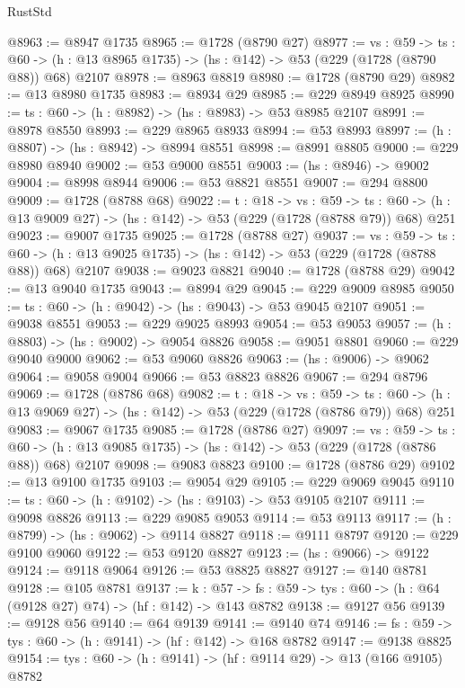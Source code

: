 \begin{lexlean}{RustStd}
\begin{coremodule}
@8963 := @8947 @1735
@8965 := @1728 (@8790 @27)
@8977 := {vs : @59} ->
  {ts : @60} -> (h : @13 @8965 @1735) -> (hs : @142) -> @53 (@229 (@1728 (@8790 @88)) @68) @2107
@8978 := @8963 @8819
@8980 := @1728 (@8790 @29)
@8982 := @13 @8980 @1735
@8983 := @8934 @29
@8985 := @229 @8949 @8925
@8990 := {ts : @60} -> (h : @8982) -> (hs : @8983) -> @53 @8985 @2107
@8991 := @8978 @8550
@8993 := @229 @8965 @8933
@8994 := @53 @8993
@8997 := (h : @8807) -> (hs : @8942) -> @8994 @8551
@8998 := @8991 @8805
@9000 := @229 @8980 @8940
@9002 := @53 @9000 @8551
@9003 := (hs : @8946) -> @9002
@9004 := @8998 @8944
@9006 := @53 @8821 @8551
@9007 := @294 @8800
@9009 := @1728 (@8788 @68)
@9022 := {t : @18} ->
  {vs : @59} ->
  {ts : @60} -> (h : @13 @9009 @27) -> (hs : @142) -> @53 (@229 (@1728 (@8788 @79)) @68) @251
@9023 := @9007 @1735
@9025 := @1728 (@8788 @27)
@9037 := {vs : @59} ->
  {ts : @60} -> (h : @13 @9025 @1735) -> (hs : @142) -> @53 (@229 (@1728 (@8788 @88)) @68) @2107
@9038 := @9023 @8821
@9040 := @1728 (@8788 @29)
@9042 := @13 @9040 @1735
@9043 := @8994 @29
@9045 := @229 @9009 @8985
@9050 := {ts : @60} -> (h : @9042) -> (hs : @9043) -> @53 @9045 @2107
@9051 := @9038 @8551
@9053 := @229 @9025 @8993
@9054 := @53 @9053
@9057 := (h : @8803) -> (hs : @9002) -> @9054 @8826
@9058 := @9051 @8801
@9060 := @229 @9040 @9000
@9062 := @53 @9060 @8826
@9063 := (hs : @9006) -> @9062
@9064 := @9058 @9004
@9066 := @53 @8823 @8826
@9067 := @294 @8796
@9069 := @1728 (@8786 @68)
@9082 := {t : @18} ->
  {vs : @59} ->
  {ts : @60} -> (h : @13 @9069 @27) -> (hs : @142) -> @53 (@229 (@1728 (@8786 @79)) @68) @251
@9083 := @9067 @1735
@9085 := @1728 (@8786 @27)
@9097 := {vs : @59} ->
  {ts : @60} -> (h : @13 @9085 @1735) -> (hs : @142) -> @53 (@229 (@1728 (@8786 @88)) @68) @2107
@9098 := @9083 @8823
@9100 := @1728 (@8786 @29)
@9102 := @13 @9100 @1735
@9103 := @9054 @29
@9105 := @229 @9069 @9045
@9110 := {ts : @60} -> (h : @9102) -> (hs : @9103) -> @53 @9105 @2107
@9111 := @9098 @8826
@9113 := @229 @9085 @9053
@9114 := @53 @9113
@9117 := (h : @8799) -> (hs : @9062) -> @9114 @8827
@9118 := @9111 @8797
@9120 := @229 @9100 @9060
@9122 := @53 @9120 @8827
@9123 := (hs : @9066) -> @9122
@9124 := @9118 @9064
@9126 := @53 @8825 @8827
@9127 := @140 @8781
@9128 := @105 @8781
@9137 := {k : @57} ->
  {fs : @59} -> {tys : @60} -> (h : @64 (@9128 @27) @74) -> (hf : @142) -> @143 @8782
@9138 := @9127 @56
@9139 := @9128 @56
@9140 := @64 @9139
@9141 := @9140 @74
@9146 := {fs : @59} -> {tys : @60} -> (h : @9141) -> (hf : @142) -> @168 @8782
@9147 := @9138 @8825
@9154 := {tys : @60} -> (h : @9141) -> (hf : @9114 @29) -> @13 (@166 @9105) @8782

\end{coremodule}
\end{lexlean}
